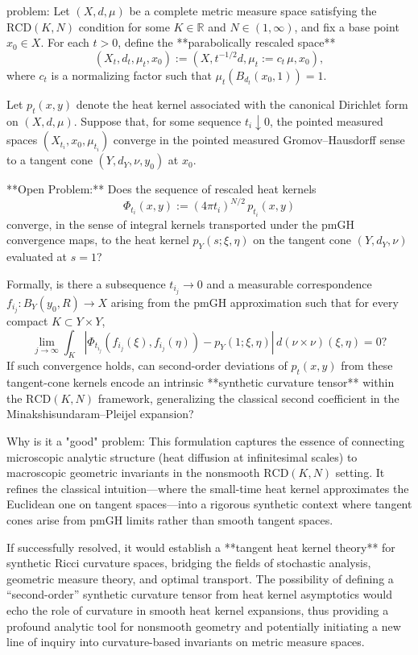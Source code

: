 problem:  
Let \((X,d,\mu)\) be a complete metric measure space satisfying the \(\mathrm{RCD}(K,N)\) condition for some \(K \in \mathbb{R}\) and \(N \in (1,\infty)\), and fix a base point \(x_0 \in X\). For each \(t > 0\), define the **parabolically rescaled space**
\[
(X_t, d_t, \mu_t, x_0) := (X, t^{-1/2}d, \mu_t := c_t\,\mu, x_0),
\]
where \(c_t\) is a normalizing factor such that \(\mu_t(B_{d_t}(x_0,1)) = 1\).  

Let \(p_t(x,y)\) denote the heat kernel associated with the canonical Dirichlet form on \((X,d,\mu)\). Suppose that, for some sequence \(t_i \downarrow 0\), the pointed measured spaces \((X_{t_i},x_0,\mu_{t_i})\) converge in the pointed measured Gromov–Hausdorff sense to a tangent cone \((Y,d_Y,\nu,y_0)\) at \(x_0\).  

**Open Problem:**  
Does the sequence of rescaled heat kernels
\[
\Phi_{t_i}(x,y) := (4\pi t_i)^{N/2}\, p_{t_i}(x,y)
\]
converge, in the sense of integral kernels transported under the \(\mathrm{pmGH}\) convergence maps, to the heat kernel \(p_Y(s;\xi,\eta)\) on the tangent cone \((Y,d_Y,\nu)\) evaluated at \(s=1\)?  

Formally, is there a subsequence \(t_{i_j}\to0\) and a measurable correspondence \(f_{i_j}: B_Y(y_0,R)\to X\) arising from the \(\mathrm{pmGH}\) approximation such that for every compact \(K\subset Y\times Y\),
\[
\lim_{j\to\infty} \int_K \left|\Phi_{t_{i_j}}(f_{i_j}(\xi), f_{i_j}(\eta)) - p_Y(1;\xi,\eta)\right|\, d(\nu\times\nu)(\xi,\eta) = 0?
\]
If such convergence holds, can second-order deviations of \(p_t(x,y)\) from these tangent-cone kernels encode an intrinsic **synthetic curvature tensor** within the \(\mathrm{RCD}(K,N)\) framework, generalizing the classical second coefficient in the Minakshisundaram–Pleijel expansion?

Why is it a "good" problem:  
This formulation captures the essence of connecting microscopic analytic structure (heat diffusion at infinitesimal scales) to macroscopic geometric invariants in the nonsmooth \(\mathrm{RCD}(K,N)\) setting. It refines the classical intuition—where the small-time heat kernel approximates the Euclidean one on tangent spaces—into a rigorous synthetic context where tangent cones arise from pmGH limits rather than smooth tangent spaces.  

If successfully resolved, it would establish a **tangent heat kernel theory** for synthetic Ricci curvature spaces, bridging the fields of stochastic analysis, geometric measure theory, and optimal transport. The possibility of defining a “second-order” synthetic curvature tensor from heat kernel asymptotics would echo the role of curvature in smooth heat kernel expansions, thus providing a profound analytic tool for nonsmooth geometry and potentially initiating a new line of inquiry into curvature-based invariants on metric measure spaces.